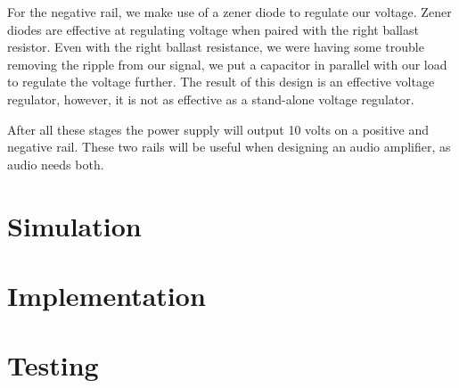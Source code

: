 \documentclass{article}
\begin{document}
For the negative rail, we make use of a zener diode to regulate our voltage. Zener diodes are effective at regulating voltage when paired with the right ballast resistor. Even 
with the right ballast resistance, we were having some trouble removing the ripple from our signal, we put a capacitor in parallel with our load to regulate the voltage further. 
The result of this design is an effective voltage regulator, however, it is not as effective as a stand-alone voltage regulator.

After all these stages the power supply will output 10 volts on a positive and negative rail. These two rails will be useful when designing an audio amplifier, as audio needs both.


\section{Simulation}

\section{Implementation}

\section{Testing}
\end{document}
